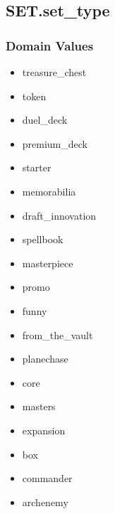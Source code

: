 \documentclass{article}
\begin{document}
\subsection{SET.set\_type}
\subsubsection{Domain Values}
\begin{multicols}{3}
    \begin{itemize}
            \item treasure\_chest
            \item token
            \item duel\_deck
            \item premium\_deck
            \item starter
            \item memorabilia
            \item draft\_innovation
            \item spellbook
            \item masterpiece
            \item promo
            \item funny
            \item from\_the\_vault
            \item planechase
            \item core
            \item masters
            \item expansion
            \item box
            \item commander
            \item archenemy
    \end{itemize}
\end{multicols}
\end{document}
